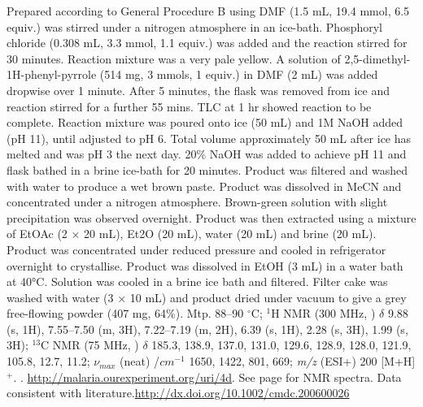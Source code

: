 \documentclass[12pt, a4paper,titlepage]{article}
\begin{document}
Prepared according to General Procedure B using DMF (1.5 mL, 19.4 mmol, 6.5 equiv.) was stirred under a nitrogen atmosphere in an ice-bath. Phosphoryl chloride (0.308 mL, 3.3 mmol, 1.1 equiv.) was added and the reaction stirred for 30 minutes. Reaction mixture was a very pale yellow. A solution of 2,5-dimethyl-1H-phenyl-pyrrole (514 mg, 3 mmols, 1 equiv.) in DMF (2 mL) was added dropwise over 1 minute. After 5 minutes, the flask was removed from ice and reaction stirred for a further 55 mins. TLC at 1 hr showed reaction to be complete. Reaction mixture was poured onto ice (50 mL) and 1M NaOH added (pH 11), until adjusted to pH 6. Total volume approximately 50 mL after ice has melted and was pH 3 the next day. 20\% NaOH was added to achieve pH 11 and flask bathed in a brine ice-bath for 20 minutes. Product was filtered and washed with water to produce a wet brown paste. Product was dissolved in MeCN and concentrated under a nitrogen atmosphere. Brown-green solution with slight precipitation was observed overnight. Product was then extracted using a mixture of EtOAc (2 × 20 mL), Et2O (20 mL), water (20 mL) and brine (20 mL). Product was concentrated under reduced pressure and cooled in refrigerator overnight to crystallise. Product was dissolved in EtOH (3 mL) in a water bath at 40°C. Solution was cooled in a brine ice bath and filtered. Filter cake was washed with water (3 × 10 mL) and product dried under vacuum to give a grey free-flowing powder (407 mg, 64\%).
Mtp. 88--90 $^\circ$C;
$^1$H NMR (300 MHz, ) $\delta$  9.88 (s, 1H), 7.55--7.50 (m, 3H), 7.22--7.19 (m, 2H), 6.39 (s, 1H), 2.28 (s, 3H), 1.99 (s, 3H); 
$^{13}$C NMR (75 MHz, ) $\delta$ 185.3, 138.9, 137.0, 131.0, 129.6, 128.9, 128.0, 121.9, 105.8, 12.7, 11.2;
 $\nu_{max}$ (neat) /$cm^{-1}$ 1650, 1422, 801, 669;
\emph{m/z} (ESI+) 200 [M+H]$^+$.
.
\url{http://malaria.ourexperiment.org/uri/4d}.
 See page \pageref{spec:LMW4} for NMR spectra. Data consistent with literature.\url{http://dx.doi.org/10.1002/cmdc.200600026}
\end{document}
